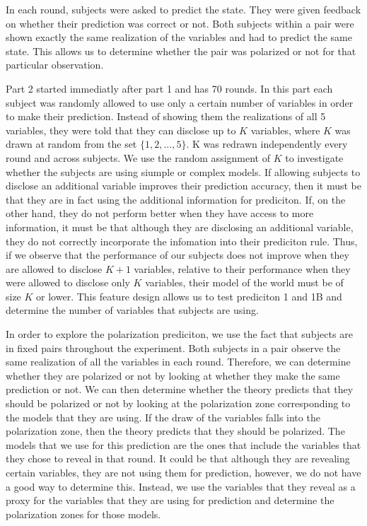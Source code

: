 \documentclass[
  12pt,
]{article}
\begin{document}
In each round, subjects were asked to predict the state. They were given
feedback on whether their prediction was correct or not. Both subjects
within a pair were shown exactly the same realization of the variables
and had to predict the same state. This allows us to determine whether
the pair was polarized or not for that particular observation.

Part 2 started immediatly after part 1 and has 70 rounds. In this part
each subject was randomly allowed to use only a certain number of
variables in order to make their prediction. Instead of showing them the
realizations of all 5 variables, they were told that they can disclose
up to \(K\) variables, where \(K\) was drawn at random from the set
\(\{1, 2, ..., 5\}\). K was redrawn independently every round and across
subjects. We use the random assignment of \(K\) to investigate whether
the subjects are using siumple or complex models. If allowing subjects
to disclose an additional variable improves their prediction accuracy,
then it must be that they are in fact using the additional information
for prediciton. If, on the other hand, they do not perform better when
they have access to more information, it must be that although they are
disclosing an additional variable, they do not correctly incorporate the
infomation into their prediciton rule. Thus, if we observe that the
performance of our subjects does not improve when they are allowed to
disclose \(K+1\) variables, relative to their performance when they were
allowed to disclose only \(K\) variables, their model of the world must
be of size \(K\) or lower. This feature design allows us to test
prediciton 1 and 1B and determine the number of variables that subjects
are using.

In order to explore the polarization prediciton, we use the fact that
subjects are in fixed pairs throughout the experiment. Both subjects in
a pair observe the same realization of all the variables in each round.
Therefore, we can determine whether they are polarized or not by looking
at whether they make the same prediction or not. We can then determine
whether the theory predicts that they should be polarized or not by
looking at the polarization zone corresponding to the models that they
are using. If the draw of the variables falls into the polarization
zone, then the theory predicts that they should be polarized. The models
that we use for this prediction are the ones that include the variables
that they chose to reveal in that round. It could be that although they
are revealing certain variables, they are not using them for prediction,
however, we do not have a good way to determine this. Instead, we use
the variables that they reveal as a proxy for the variables that they
are using for prediction and determine the polarization zones for those
models.
\end{document}
